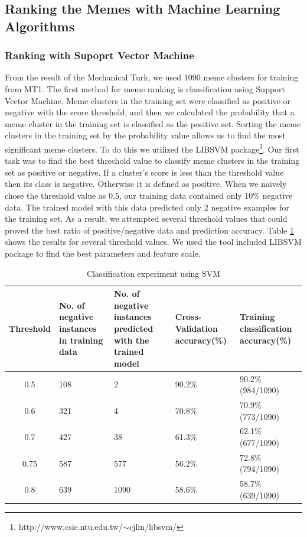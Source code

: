\documentclass{sig-alternate}
\begin{document}
\subsection{Ranking the Memes with Machine Learning Algorithms}
\subsubsection{Ranking with Supoprt Vector Machine}



From the result of the Mechanical Turk, we used 1090 meme clusters for training from MT1. The first method for meme ranking is classification using Support Vector Machine. Meme clusters in the training set were classified as positive or negative with the score threshold, and then we calculated the probability that a meme cluster in the training set is classified as the positive set. Sorting the meme clusters in the training set by the probability value allows us to find the most significant meme clusters. To do this we utilized the LIBSVM package\footnote{http://www.csie.ntu.edu.tw/$\sim$cjlin/libsvm/}. Our first task was to find the best threshold value to classify meme clusters in the training set as positive or negative. If a cluster's score is less than the threshold value then its class is negative.  Otherwise it is defined as positive. When we naively chose the threshold value as 0.5, our training data contained only 10\% negative data.   The trained model with this data predicted only 2 negative examples for the training set. As a result, we attempted several threshold values that could proved the best ratio of positive/negative data and prediction accuracy. Table \ref{table:svm} shows the results for several threshold values. We used the tool included LIBSVM package to find the best parameters and feature scale.

\begin{table}[t!h]
\begin{center}
\begin{tabular}{c|p{3.5cm}|p{3.5cm}|p{3.5cm}|p{3.5cm}}

Threshold&No. of negative instances in training data&No. of negative instances predicted with the trained model&Cross-Validation accuracy(\%)&Training classification accuracy(\%)\\
\hline
0.5&108&2&90.2\%&90.2\% (984/1090)\\
0.6&321&4&70.8\%&70.9\% (773/1090)\\
0.7&427&38&61.3\%&62.1\% (677/1090)\\
0.75&587&577&56.2\%&72.8\% (794/1090)\\
0.8&639&1090&58.6\%&58.7\% (639/1090)\\
\end{tabular}
\caption{Classification experiment using SVM}
\label{table:svm}
\end{center}
\end{table}
\end{document}
